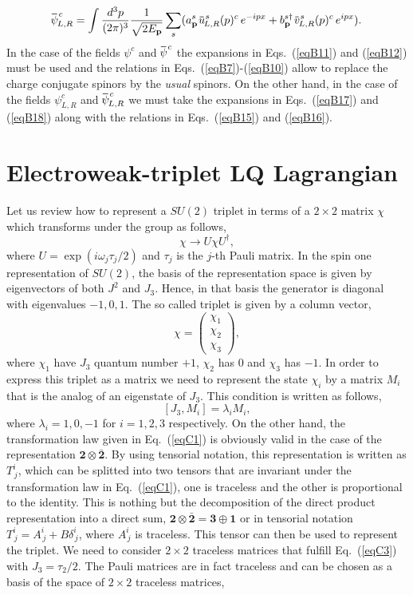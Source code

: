 \documentclass[aps,preprint,tightenlines,floatfix,superscriptaddress,nofootinbib,showpacs]{revtex4-1}
\def\beq{\begin{equation}}
\def\eeq{\end{equation}}
\newcommand*\xbar[1]{%
  \hbox{%
    \vbox{%
      \hrule height 0.5pt %
      \kern0.3ex%
      \hbox{%
        \kern-0.1em%
        \ensuremath{#1}%
        \kern-0.1em%
      }%
    }%
  }%
}
\begin{document}
\beq
\label{eqB18}
\xbar{\psi}^{\,c}_{L,R} = \int \frac{d^3p}{(2\pi)^3}\frac{1}{\sqrt{2E_{\mathbf{p}}}}\sum_s (a^s_{\mathbf{p}}\,\xbar{u}^{\,s}_{L,R}(p)^c \,e^{-ipx}+b^{s\dagger}_{\mathbf{p}}\,\xbar{v}^{\,s}_{L,R}(p)^c\, e^{ipx}).
\eeq
In the case of the fields $\psi^c$ and $\xbar{\psi}^{\,c}$ the expansions in Eqs.~(\ref{eqB11}) and (\ref{eqB12}) must be used and the relations in Eqs.~(\ref{eqB7})-(\ref{eqB10}) allow to replace the charge conjugate spinors by the {\em usual} spinors. On the other hand, in the case of the fields $\psi^c_{L,R}$ and $\xbar{\psi}^{\,c}_{L,R}$ we must take the expansions in Eqs.~(\ref{eqB17}) and (\ref{eqB18}) along with the relations in Eqs.~(\ref{eqB15}) and (\ref{eqB16}). 
\section{Electroweak-triplet LQ Lagrangian}
\label{ap3}
Let us review how to represent a $SU(2)$ triplet in terms of a $2\times 2$ matrix $\chi$ which transforms under the group as follows,
\beq
\label{eqC1}
\chi \to U \chi U^{\dagger},
\eeq 
where $U= \exp(i\omega _j\tau_j/2)$ and $\tau_j$ is the $j$-th Pauli matrix. In the spin one representation of $SU(2)$, the basis of the representation space is given by eigenvectors of both $J^2$ and $J_3$. Hence, in that basis the generator is diagonal with eigenvalues $-1,0,1$. The so called triplet is given by a column vector,
\beq
\label{eqC2}
\chi=
\begin{pmatrix}
\chi_1 \\
\chi_2 \\
\chi_3
\end{pmatrix},
\eeq 
where $\chi_1$ have $J_3$ quantum number $+1$, $\chi_2$ has $0$ and $\chi_3$ has $-1$. In order to express this triplet as a matrix we need to represent the state $\chi_i$ by a matrix $M_i$ that is the analog of an eigenstate of $J_3$. This condition is written as follows,
\beq
\label{eqC3}
[J_3,M_i]=\lambda_i M_i,
\eeq
where $\lambda_i=1,0,-1$ for $i=1,2,3$ respectively. On the other hand, the transformation law given in Eq.~(\ref{eqC1}) is obviously valid in the case of the representation $\mathbf{2}\otimes \mathbf{\bar{2}}$. By using tensorial notation, this representation is written as $T^i_{\,j}$, which can be splitted into two tensors that are invariant under the transformation law in Eq.~(\ref{eqC1}), one is traceless and the other is proportional to the identity. This is nothing but the decomposition of the direct product representation into a direct sum, $\mathbf{2}\otimes \mathbf{\bar{2}}=\mathbf{3}\oplus\mathbf{1}$ or in tensorial notation $T^i_{\,j}=A^i_{\,j}+B\delta^i_{\,j}$, where $A^i_{\,j}$ is traceless. This tensor can then be used to represent the triplet. We need to consider $2\times 2$ traceless matrices that fulfill Eq.~(\ref{eqC3}) with $J_3=\tau_2/2$. The Pauli matrices are in fact traceless and can be chosen as a basis of the space of $2\times 2$ traceless matrices,
\end{document}
